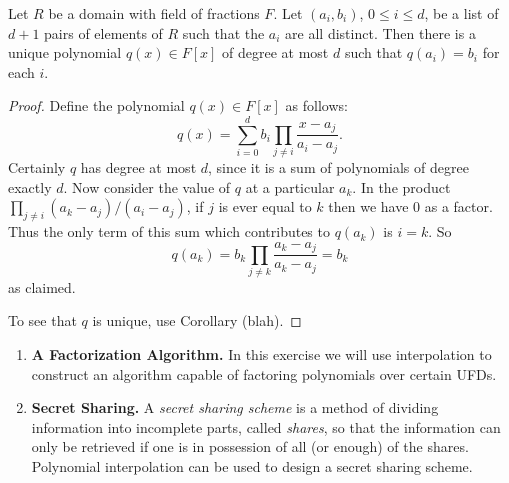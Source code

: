 \documentclass{article}
\begin{document}

\begin{prop}
Let $R$ be a domain with field of fractions $F$. Let $(a_i, b_i)$, $0 \leq i \leq d$, be a list of $d+1$ pairs of elements of $R$ such that the $a_i$ are all distinct. Then there is a unique polynomial $q(x) \in F[x]$ of degree at most $d$ such that $q(a_i) = b_i$ for each $i$.
\end{prop}

\begin{proof}
Define the polynomial $q(x) \in F[x]$ as follows: \[ q(x) = \sum_{i=0}^d b_i \prod_{j \neq i} \frac{x - a_j}{a_i - a_j}. \] Certainly $q$ has degree at most $d$, since it is a sum of polynomials of degree exactly $d$. Now consider the value of $q$ at a particular $a_k$. In the product $\prod_{j \neq i}(a_k - a_j)/(a_i - a_j)$, if $j$ is ever equal to $k$ then we have 0 as a factor. Thus the only term of this sum which contributes to $q(a_k)$ is $i = k$. So \[ q(a_k) = b_k \prod_{j \neq k} \frac{a_k - a_j}{a_k - a_j} = b_k \] as claimed.

To see that $q$ is unique, use Corollary (blah). 
\end{proof}

\begin{enumerate}
\item \textbf{A Factorization Algorithm.} In this exercise we will use interpolation to construct an algorithm capable of factoring polynomials over certain UFDs.

\item \textbf{Secret Sharing.} A \emph{secret sharing scheme} is a method of dividing information into incomplete parts, called \emph{shares}, so that the information can only be retrieved if one is in possession of all (or enough) of the shares. Polynomial interpolation can be used to design a secret sharing scheme. 
\end{enumerate}
\end{document}
